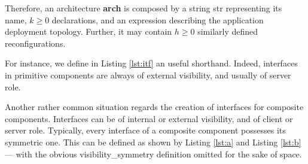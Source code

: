 			
		Therefore, an architecture \textbf{arch} is composed by a string \textsf{str} representing its name,
		$k\geq 0$ declarations, and an expression describing the application deployment topology. Further, it may contain 
	$h \geq 0$ similarly defined reconfigurations.
				
		
		
	
	
	\noindent	 For instance, we define in Listing \ref{lst:itf}  an useful shorthand. Indeed, 
	interfaces in primitive components are always of \textsf{external} \textsf{visibility}, and
	usually of \textsf{server} \textsf{role}. 
	
	
	
	\noindent Another rather common situation regards the creation of interfaces for composite components. Interfaces can
	be of \textsf{internal} or \textsf{external} visibility, and of \textsf{client} or \textsf{server} role.	Typically, every interface
	of a composite component possesses its symmetric one. This can be defined as shown by Listing \ref{lst:a} and
	Listing \ref{lst:b} --- with the obvious 
	\textsf{visibility\_symmetry} definition omitted for the sake of space.	
	
	\begin{figure}[ht]
	\begin{minipage}[b]{0.35\linewidth} 
	\centering

   

	\end{minipage}
	\hspace{0.25cm}
	\begin{minipage}[b]{0.65\linewidth} 
	\centering
 
	  
 
	\end{minipage}
	\end{figure}	  	


